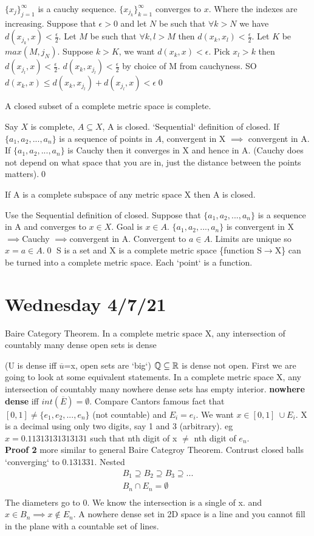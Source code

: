 \documentclass{article}
\begin{document}
  $\{x_j\}_{j=1}^\infty$ is a cauchy sequence. $\{x_{j_k}\}_{k=1}^\infty$ converges to $x$. Where the indexes are increasing. Suppose that $\epsilon>0$ and let $N$ be such that $\forall k>N$ we have $d(x_{j_k},x)< \frac{\epsilon}{2}$. Let $M$ be such that $\forall k,l>M$ then $d(x_k,x_l)<\frac{\epsilon}{2}$. Let $K$ be $max(M,j_N)$. Suppose $k>K$, we want $d(x_k,x)<\epsilon$. Pick $x_l>k$ then $d(x_{j_l},x)<\frac{\epsilon}{2}$. $d(x_k,x_{j_l})<\frac{\epsilon}{2}$ by choice of M from cauchyness. SO $d(x_k,x)\leq d(x_k,x_{j_l})+d(x_{j_l},x)<\epsilon$\qed
  \begin{theorem}
    A closed subset of a complete metric space is complete.
  \end{theorem}
  Say $X$ is complete, $A\subseteq X$, A is closed. `Sequential` definition of closed. If $\{a_1,a_2,...,a_{n}\}$ is a sequence of points in $A$, convergent in X $\implies$ convergent in A. If $\{a_1,a_2,...,a_{n}\}$ is Cauchy then it converges in X and hence in A. (Cauchy does not depend on what space that you are in, just the distance between the points matters).\qed
  \begin{theorem}
  If A is a complete subspace of any metric space X then A is closed. \end{theorem}
  Use the Sequential definition of closed. Suppose that $\{a_1,a_2,...,a_{n}\}$ is a sequence in A and converges to $x\in X$. Goal is $x\in A$. $\{a_1,a_2,...,a_{n}\}$ is convergent in X $\implies$Cauchy $\implies$convergent in A. Convergent to $a\in A$. Limits are unique so $x=a\in A$.\qed
  S is a set and X is a complete metric space \{function S$\to$X\} can be turned into a complete metric space. Each `point` is a function.
  \section{Wednesday 4/7/21}
  \begin{theorem} Baire Category Theorem. In a complete metric space X, any intersection of countably many dense open sets is dense \end{theorem}
  (U is dense iff $\overline{u}$=x, open sets are `big`) $\mathbb{Q}\subseteq\mathbb{R}$ is dense not open. First we are going to look at some equivalent statements. In a complete metric space X, any intersection of countably many nowhere dense sets has empty interior. \textbf{nowhere dense} iff $int(\overline{E})=\emptyset$. Compare Cantors famous fact that $[0,1]\neq\{e_1,e_2,...,e_{n}\}$ (not countable) and $E_i=e_i$. We want $x\in[0,1]\ \cup E_i$. X is a decimal using only two digits, say 1 and 3 (arbitrary). eg $x=0.11313131313131$ such that nth digit of x $\neq$ nth digit of $e_n$.\\
  \textbf{Proof 2} more similar to general Baire Categroy Theorem. Contrust closed balls `converging` to $0.131331$. Nested
  \begin{align*}
    B_1\supseteq B_2\supseteq B_3\supseteq ...\\
    B_n\cap E_n=\emptyset\\
  \end{align*}
  The diameters go to 0. We know the intersection is a single of x. and $x\in B_n\implies x\notin E_n$. A nowhere dense set in 2D space is a line and you cannot fill in the plane with a countable set of lines.\\
\end{document}

